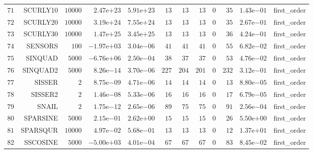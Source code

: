 \begin{longtable}{rrrrrrrrrrrr}
  \(    71\) & SCURLY10 & \( 10000\) & \( 2.47\)e\(+23\) & \( 5.91\)e\(+23\) & \(    13\) & \(    13\) & \(    13\) & \(     0\) & \(    35\) & \( 1.43\)e\(-01\) & first\_order \\
  \(    72\) & SCURLY20 & \( 10000\) & \( 3.19\)e\(+24\) & \( 7.55\)e\(+24\) & \(    13\) & \(    13\) & \(    13\) & \(     0\) & \(    35\) & \( 2.67\)e\(-01\) & first\_order \\
  \(    73\) & SCURLY30 & \( 10000\) & \( 1.47\)e\(+25\) & \( 3.45\)e\(+25\) & \(    13\) & \(    13\) & \(    13\) & \(     0\) & \(    36\) & \( 4.24\)e\(-01\) & first\_order \\
  \(    74\) & SENSORS & \(   100\) & \(-1.97\)e\(+03\) & \( 3.04\)e\(-06\) & \(    41\) & \(    41\) & \(    41\) & \(     0\) & \(    55\) & \( 6.82\)e\(-02\) & first\_order \\
  \(    75\) & SINQUAD & \(  5000\) & \(-6.76\)e\(+06\) & \( 2.50\)e\(-04\) & \(    38\) & \(    37\) & \(    37\) & \(     0\) & \(    53\) & \( 4.76\)e\(-02\) & first\_order \\
  \(    76\) & SINQUAD2 & \(  5000\) & \( 8.26\)e\(-14\) & \( 3.70\)e\(-06\) & \(   227\) & \(   204\) & \(   201\) & \(     0\) & \(   232\) & \( 3.12\)e\(-01\) & first\_order \\
  \(    77\) & SISSER & \(     2\) & \( 8.75\)e\(-09\) & \( 4.71\)e\(-06\) & \(    14\) & \(    14\) & \(    14\) & \(     0\) & \(    13\) & \( 8.80\)e\(-05\) & first\_order \\
  \(    78\) & SISSER2 & \(     2\) & \( 1.46\)e\(-08\) & \( 5.33\)e\(-06\) & \(    16\) & \(    16\) & \(    16\) & \(     0\) & \(    17\) & \( 6.79\)e\(-05\) & first\_order \\
  \(    79\) & SNAIL & \(     2\) & \( 1.75\)e\(-12\) & \( 2.65\)e\(-06\) & \(    89\) & \(    75\) & \(    75\) & \(     0\) & \(    91\) & \( 2.56\)e\(-04\) & first\_order \\
  \(    80\) & SPARSINE & \(  5000\) & \( 2.15\)e\(-01\) & \( 2.62\)e\(+00\) & \(    15\) & \(    15\) & \(    15\) & \(     0\) & \(    26\) & \( 5.50\)e\(+00\) & first\_order \\
  \(    81\) & SPARSQUR & \( 10000\) & \( 4.97\)e\(-02\) & \( 5.68\)e\(-01\) & \(    13\) & \(    13\) & \(    13\) & \(     0\) & \(    12\) & \( 1.37\)e\(+01\) & first\_order \\
  \(    82\) & SSCOSINE & \(  5000\) & \(-5.00\)e\(+03\) & \( 4.01\)e\(-04\) & \(    67\) & \(    67\) & \(    67\) & \(     0\) & \(    83\) & \( 8.45\)e\(-02\) & first\_order \\

\end{longtable}
